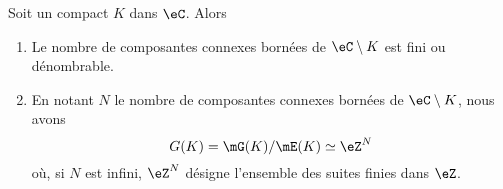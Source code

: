 \begin{theorem}		\label{THOooDGXSooMMHTds}
	Soit un compact \( K\) dans \( \eC\). Alors
	\begin{enumerate}
		\item
		      Le nombre de composantes connexes bornées de \( \eC\setminus K\) est fini ou dénombrable.
		\item		\label{ITEMooWLGDooZGORrP}
		      En notant \( N\) le nombre de composantes connexes bornées de \( \eC\setminus K\), nous avons
		      \begin{equation}
			      G(K)=\mG(K)/\mE(K)\simeq \eZ^N
		      \end{equation}
		      où, si \( N\) est infini, \( \eZ^N\) désigne l'ensemble des suites finies dans \( \eZ\).
	\end{enumerate}
\end{theorem}


